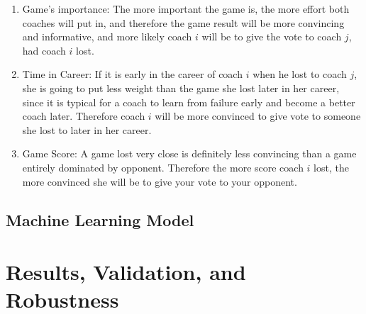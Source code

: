 \documentclass[titlepage]{article}
\begin{document}
\begin{enumerate}
\item Game's importance: The more important the game is, the more effort both coaches will put in, and therefore the game result will be more convincing and informative, and more likely coach $i$ will be to give the vote to coach $j$, had coach $i$ lost.
\item Time in Career: If it is early in the career of coach $i$ when he lost to coach $j$, she is going to put less weight than the game she lost later in her career, since it is typical for a coach to learn from failure early and become a better coach later. Therefore coach $i$ will be more convinced to give vote to someone she lost to later in her career.
\item Game Score: A game lost very close is definitely less convincing than a game entirely dominated by opponent. Therefore the more score coach $i$ lost, the more convinced she will be to give your vote to your opponent.


\end{enumerate}



\subsection{Machine Learning Model}



\section{Results, Validation, and Robustness}
\end{document}
